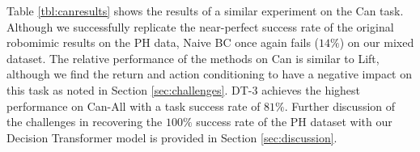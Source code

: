 \begin{table}[]
\centering
\caption{\textbf{Lift-All Results}}
\label{tbl:liftresults}
\end{table}

Table \ref{tbl:canresults} shows the results of a similar experiment on the Can task. Although we successfully replicate the near-perfect success rate of the original robomimic results on the PH data, Naive BC once again fails ($14\%$) on our mixed dataset. The relative performance of the methods on Can is similar to Lift, although we find the return and action conditioning to have a negative impact on this task as noted in Section \ref{sec:challenges}. \hspace{7mm} DT-$3$ achieves the highest performance on Can-All with a task success rate of $81\%$. Further discussion of the challenges in recovering the $100\%$ success rate of the PH dataset with our Decision Transformer model is provided in Section \ref{sec:discussion}.



\begin{table}[]
\centering
\caption{\textbf{Can-All Results}}
\label{tbl:canresults}
\end{table}


